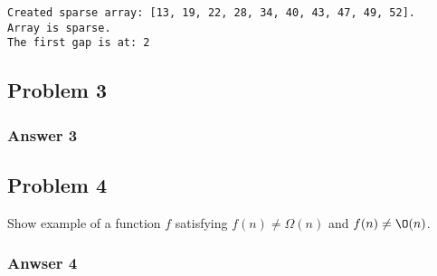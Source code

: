 \documentclass[11pt]{article}
\begin{document}
\begin{verbatim}
Created sparse array: [13, 19, 22, 28, 34, 40, 43, 47, 49, 52].
Array is sparse.
The first gap is at: 2
\end{verbatim}

\subsection{Problem 3}
\label{sec:orgheadline7}

\subsubsection{Answer 3}
\label{sec:orgheadline6}

\subsection{Problem 4}
\label{sec:orgheadline9}
Show example of a function \(f\) satisfying \(f(n) \neq \Omega(n)\) and
\(f(n) \neq \O(n)\).

\subsubsection{Anwser 4}
\label{sec:orgheadline8}
\end{document}
